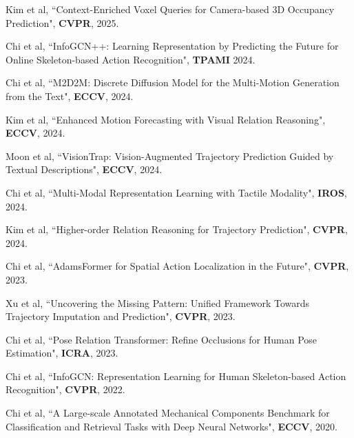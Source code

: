 


\begin{cventries}
\vspace{-1em}
\cvpub
{} %
{ %
\begin{cvitems}
    \item {Kim et al, ``Context-Enriched Voxel Queries for Camera-based 3D Occupancy Prediction", \textbf{CVPR}, 2025.}
    \item {Chi et al, ``InfoGCN++: Learning Representation by Predicting the Future for Online Skeleton-based Action Recognition", \textbf{TPAMI} 2024. }
    \item {Chi et al, ``M2D2M: Discrete Diffusion Model for the Multi-Motion Generation from the Text", \textbf{ECCV}, 2024.}
    \item {Kim et al, ``Enhanced Motion Forecasting with Visual Relation Reasoning", \textbf{ECCV}, 2024.}
    \item {Moon et al, ``VisionTrap: Vision-Augmented Trajectory Prediction Guided by Textual Descriptions", \textbf{ECCV}, 2024.}
    \item {Chi et al, ``Multi-Modal Representation Learning with Tactile Modality", \textbf{IROS}, 2024.}
    \item {Kim et al, ``Higher-order Relation Reasoning for Trajectory Prediction", \textbf{CVPR}, 2024.}
    \item {Chi et al, ``AdamsFormer for Spatial Action Localization in the Future", \textbf{CVPR}, 2023.}
    \item {Xu et al, ``Uncovering the Missing Pattern: Unified Framework Towards Trajectory Imputation and Prediction", \textbf{CVPR}, 2023.}
    \item {Chi et al, ``Pose Relation Transformer: Refine Occlusions for Human Pose Estimation", \textbf{ICRA}, 2023.}
    \item {Chi et al, ``InfoGCN: Representation Learning for Human Skeleton-based Action Recognition", \textbf{CVPR}, 2022.}
    \item {Chi et al, ``A Large-scale Annotated Mechanical Components Benchmark for Classification and Retrieval Tasks with Deep Neural Networks", \textbf{ECCV}, 2020.}
\end{cvitems}
}


\end{cventries}
